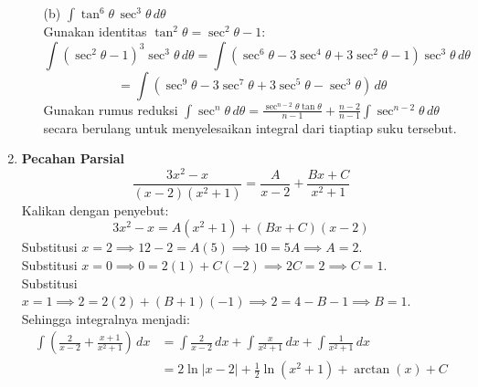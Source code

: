 \documentclass[a4paper,12pt]{article}
\begin{document}
\begin{enumerate}
\begin{enumerate}
          \item[(b)] $\int \tan^6\theta\,\sec^3\theta\,d\theta$ \\
                Gunakan identitas $\tan^2\theta = \sec^2\theta - 1$:
                \[ \int (\sec^2\theta - 1)^3 \sec^3\theta\,d\theta = \int (\sec^6\theta - 3\sec^4\theta + 3\sec^2\theta - 1)\sec^3\theta\,d\theta \]
                \[ = \int (\sec^9\theta - 3\sec^7\theta + 3\sec^5\theta - \sec^3\theta)\,d\theta \]
                Gunakan rumus reduksi $\int \sec^n\theta\,d\theta = \frac{\sec^{n-2}\theta\tan\theta}{n-1} + \frac{n-2}{n-1}\int \sec^{n-2}\theta\,d\theta$ secara berulang untuk menyelesaikan integral dari tiaptiap suku tersebut.
        \end{enumerate}

  \item \textbf{Pecahan Parsial}
        \[ \frac{3x^2-x}{(x-2)(x^2+1)} = \frac{A}{x-2} + \frac{Bx+C}{x^2+1} \]
        Kalikan dengan penyebut:
        \[ 3x^2-x = A(x^2+1) + (Bx+C)(x-2) \]
        Substitusi $x = 2 \implies 12 - 2 = A(5) \implies 10 = 5A \implies A = 2$. \\
        Substitusi $x = 0 \implies 0 = 2(1) + C(-2) \implies 2C = 2 \implies C = 1$. \\
        Substitusi $x = 1 \implies 2 = 2(2) + (B+1)(-1) \implies 2 = 4 - B - 1 \implies B = 1$. \\
        Sehingga integralnya menjadi:
        \begin{align*}
          \int \left( \frac{2}{x-2} + \frac{x+1}{x^2+1} \right)\,dx &= \int \frac{2}{x-2}\,dx + \int \frac{x}{x^2+1}\,dx + \int \frac{1}{x^2+1}\,dx \\
          &= 2\ln|x-2| + \frac{1}{2}\ln(x^2+1) + \arctan(x) + C
        \end{align*}


\end{enumerate}
\end{document}
